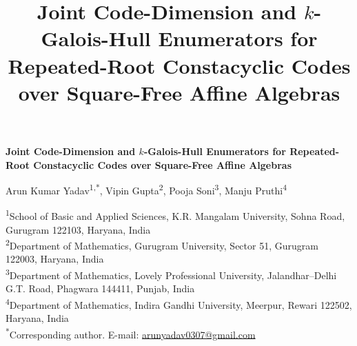 \documentclass[11pt,a4paper]{article}
\title{Joint Code-Dimension and \texorpdfstring{$k$}{k}-Galois-Hull Enumerators for Repeated-Root Constacyclic Codes over Square-Free Affine Algebras}
\author{}
\date{}
\numberwithin{equation}{section}
\theoremstyle{plain}
\theoremstyle{definition}
\theoremstyle{remark}
\begin{document}
\begin{center}
{\LARGE\bfseries Joint Code-Dimension and \texorpdfstring{$k$}{k}-Galois-Hull Enumerators for Repeated-Root Constacyclic Codes over Square-Free Affine Algebras\par}
\vspace{1.2em}
{\large Arun Kumar Yadav\textsuperscript{1,*}, Vipin Gupta\textsuperscript{2},
Pooja Soni\textsuperscript{3}, Manju Pruthi\textsuperscript{4}\par}
\vspace{1em}
{\small
\textsuperscript{1}School of Basic and Applied Sciences,
K.R. Mangalam University, Sohna Road, Gurugram 122103, Haryana, India\\
\textsuperscript{2}Department of Mathematics, Gurugram University,
Sector 51, Gurugram 122003, Haryana, India\\
\textsuperscript{3}Department of Mathematics, Lovely Professional University,
Jalandhar--Delhi G.T. Road, Phagwara 144411, Punjab, India\\
\textsuperscript{4}Department of Mathematics, Indira Gandhi University,
Meerpur, Rewari 122502, Haryana, India\\[0.6em]
\textsuperscript{*}Corresponding author.
E-mail: \href{mailto:arunyadav0307@gmail.com}{arunyadav0307@gmail.com}
\par}
\end{center}

\vspace{0.5em}
\end{document}
